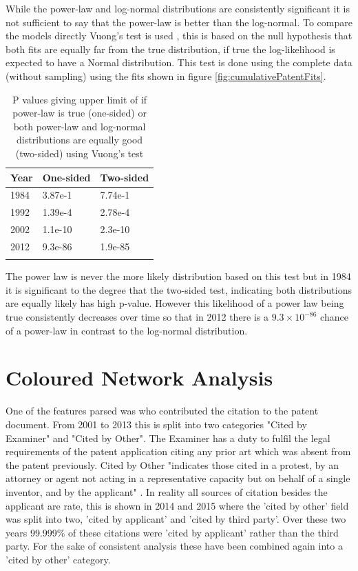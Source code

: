 While the power-law and log-normal distributions are consistently significant it is not sufficient to say that the power-law is better than the log-normal. To compare the models directly Vuong's test is used \cite{vuong1989likelihood}, this is based on the null hypothesis that both fits are equally far from the true distribution, if true the log-likelihood is expected to have a Normal distribution. This test is done using the complete data (without sampling) using the fits shown in figure \ref{fig:cumulativePatentFits}. 

\begin{table}
\caption{P values giving upper limit of if power-law is true (one-sided) or both power-law and log-normal distributions are equally good (two-sided) using Vuong's test}
\label{tab:Vuong}
\centering
\begin{tabular}{l l l}
\toprule
Year & One-sided & Two-sided \\
\midrule
1984 & 3.87e-1 & 7.74e-1  \\
1992 & 1.39e-4 & 2.78e-4  \\
2002 & 1.1e-10 & 2.3e-10  \\
2012 & 9.3e-86 & 1.9e-85  \\
\bottomrule\\
\end{tabular}
\end{table}

The power law is never the more likely distribution based on this test but in 1984 it is significant to the degree that the two-sided test, indicating both distributions are equally likely has high p-value. However this likelihood of a power law being true consistently decreases over time so that in 2012 there is a $9.3 \times 10^{-86}$ chance of a power-law in contrast to the log-normal distribution. 


\section{Coloured Network Analysis} \label{Coloured Network Analysis}

One of the features parsed was who contributed the citation to the patent document. From 2001 to 2013 this is split into two categories "Cited by Examiner" and "Cited by Other". The Examiner has a duty to fulfil the legal requirements of the patent application citing any prior art which was absent from the patent previously. Cited by Other "indicates those cited in a protest, by an attorney or agent not acting in a representative capacity but on behalf of a single inventor, and by the applicant" \cite{USPTOSummary}. In reality all sources of citation besides the applicant are rate, this is shown in 2014 and 2015 where the 'cited by other' field was split into two, 'cited by applicant' and 'cited by third party'. Over these two years 99.999\% of these citations were 'cited by applicant' rather than the third party. For the sake of consistent analysis these have been combined again into a 'cited by other' category.

